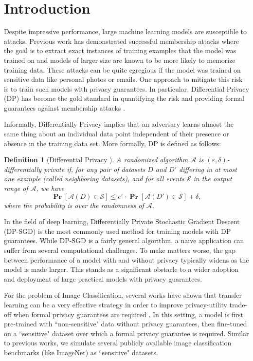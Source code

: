 \documentclass[letterpaper]{article} \usepackage{fullpage}
\def\cA{\mathcal{A}}
\def\cS{\mathcal{S}}
\renewcommand{\Pr}{\mathop{\mathbf{Pr}}}
\newtheorem{definition}[lem]{Definition}
\renewcommand{\epsilon}{\varepsilon}
\begin{document}
\section{Introduction}
Despite impressive performance, large machine learning models are susceptible to attacks. Previous work has demonstrated successful membership attacks where the goal is to extract exact instances of training examples that the model was trained on \citep{shokri2017membership,carlini2019secret, carlini2020extracting,choquettechoo2020labelonly,liu2021mldoctor,balle2022reconstructing} and models of larger size are known to be more likely to memorize training data. These attacks can be quite egregious if the model was trained on sensitive data like personal photos or emails. One approach to mitigate this risk is to train such models with privacy guarantees. In particular, Differential Privacy (DP) has become the gold standard in quantifying the risk and providing formal guarantees against membership attacks \citep{adv_inst2021}.

Informally, Differentially Privacy implies that an adversary learns almost the same thing about an individual data point independent of their presence or absence in the training data set. More formally, DP is defined as follows:
\begin{definition}
[Differential Privacy \citep{dwork2006dp,ODO}] A randomized algorithm $\cA$ is $(\epsilon,\delta)$-differentially private if, for any pair of datasets $D$ and $D'$ differing in at most one example (called {\em neighboring datasets}), and for all events $\cS$ in the output range of $\cA$, we have 
$$\Pr[\cA(D)\in \cS] \leq e^{\epsilon} \cdot \Pr[\cA(D')\in \cS] +\delta,$$
where the probability is over the randomness of $\cA$.
\label{def:dp}
\end{definition}

In the field of deep learning, Differentially Private Stochastic Gradient Descent (DP-SGD) \citep{song2013stochastic,Bassily_2014,abadi2016dpsgd} is the most commonly used method for training models with DP guarantees. While DP-SGD is a fairly general algorithm, a naive application can suffer from several computational challenges. To make matters worse, the gap between performance of a model with and without privacy typically widens as the model is made larger. This stands as a significant obstacle to a wider adoption and deployment of large practical models with privacy guarantees.

For the problem of Image Classification, several works have shown that transfer learning can be a very effective strategy in order to improve privacy-utility trade-off when formal privacy guarantees are required \citep{kurakin2022training,mehta2022large,dm_transfer_2022}. In this setting, a model is first pre-trained with ``non-sensitive" data without privacy guarantees, then fine-tuned on a ``sensitive" dataset over which a formal privacy guarantee is required. Similar to previous works, we simulate several publicly available image classification benchmarks (like ImageNet) as ``sensitive" datasets.
\end{document}

